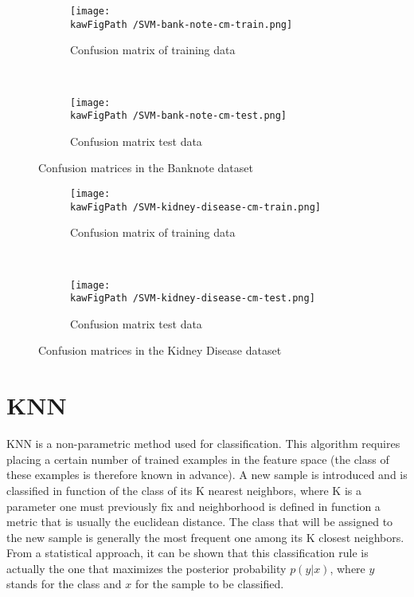 \documentclass[11pt,a4paper]{article}
\def \kawFigPath {Output/Images}
\begin{document}
\begin{figure}[H]
    \centering
    \begin{subfigure}[b]{0.45\textwidth} %
        \centering \texttt{[image: \\kawFigPath /SVM-bank-note-cm-train.png]}
        \caption{Confusion matrix of training data}\label{ligne_on}
    \end{subfigure}
    ~
    \begin{subfigure}[b]{0.45\textwidth}
        \centering \texttt{[image: \\kawFigPath /SVM-bank-note-cm-test.png]}
        \caption{Confusion matrix test data}\label{ligne_off}
    \end{subfigure}
    \caption{Confusion matrices in the Banknote dataset}\label{figxx}
\end{figure}

\begin{figure}[H]
    \centering
    \begin{subfigure}[b]{0.45\textwidth} %
        \centering \texttt{[image: \\kawFigPath /SVM-kidney-disease-cm-train.png]}
        \caption{Confusion matrix of training data}\label{ligne_on}
    \end{subfigure}
    ~
    \begin{subfigure}[b]{0.45\textwidth}
        \centering \texttt{[image: \\kawFigPath /SVM-kidney-disease-cm-test.png]}
        \caption{Confusion matrix test data}\label{ligne_off}
    \end{subfigure}
    \caption{Confusion matrices in the Kidney Disease dataset}\label{figxx}
\end{figure}

\section{KNN}
KNN is a non-parametric method used for classification. This algorithm requires placing a certain number of trained examples in the feature space (the class of these examples is therefore known in advance). A new sample is introduced and is classified in function of the class of its K nearest neighbors, where K is a parameter one must previously fix and neighborhood is defined in function a metric that is usually the euclidean distance. The class that will be assigned to the new sample is generally the most frequent one among its K closest neighbors. 
From a statistical approach, it can be shown that this classification rule is actually the one that maximizes the posterior probability $p(y|x)$, where $y$ stands for the class and $x$ for the sample to be classified. 
\end{document}
